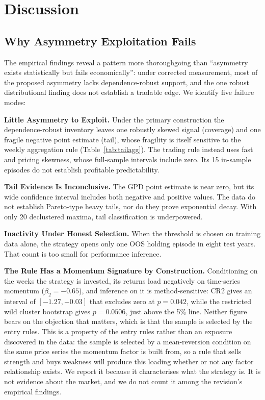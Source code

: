 \documentclass[11pt]{article}
\begin{document}
\section{Discussion}

\subsection{Why Asymmetry Exploitation Fails}

The empirical findings reveal a pattern more thoroughgoing than ``asymmetry exists statistically but fails economically'': under corrected measurement, most of the proposed asymmetry lacks dependence-robust support, and the one robust distributional finding does not establish a tradable edge. We identify five failure modes:

\textbf{Little Asymmetry to Exploit.} Under the primary construction the dependence-robust inventory leaves one robustly skewed signal (coverage) and one fragile negative point estimate (tail), whose fragility is itself sensitive to the weekly aggregation rule (Table~\ref{tab:tailagg}). The trading rule instead uses fast and pricing skewness, whose full-sample intervals include zero. Its 15 in-sample episodes do not establish profitable predictability.

\textbf{Tail Evidence Is Inconclusive.} The GPD point estimate is near zero, but its wide confidence interval includes both negative and positive values. The data do not establish Pareto-type heavy tails, nor do they prove exponential decay. With only 20 declustered maxima, tail classification is underpowered.

\textbf{Inactivity Under Honest Selection.} When the threshold is chosen on training data alone, the strategy opens only one OOS holding episode in eight test years. That count is too small for performance inference.

\textbf{The Rule Has a Momentum Signature by Construction.} Conditioning on the weeks the strategy is invested, its returns load negatively on time-series momentum ($\beta_2 = -0.65$), and inference on it is method-sensitive: CR2 gives an interval of $[-1.27, -0.03]$ that excludes zero at $p = 0.042$, while the restricted wild cluster bootstrap gives $p = 0.0506$, just above the 5\% line. Neither figure bears on the objection that matters, which is that the sample is selected by the entry rules. This is a property of the entry rules rather than an exposure discovered in the data: the sample is selected by a mean-reversion condition on the same price series the momentum factor is built from, so a rule that sells strength and buys weakness will produce this loading whether or not any factor relationship exists. We report it because it characterises what the strategy is. It is not evidence about the market, and we do not count it among the revision's empirical findings.
\end{document}
